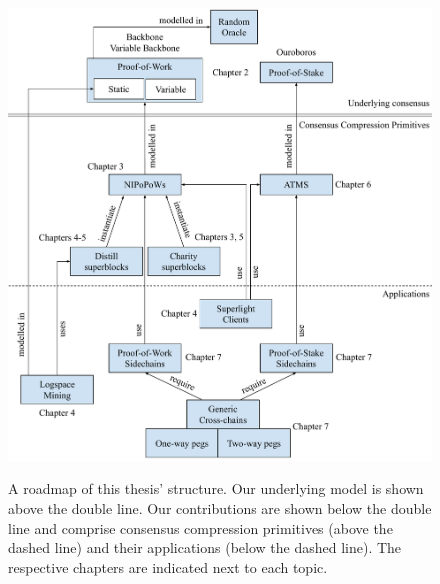 \begin{figure}
    \caption{
      A roadmap of this thesis' structure.
      Our underlying model is shown above the double line.
      Our contributions are shown below the double line and comprise consensus
      compression primitives (above the dashed line) and their applications
      (below the dashed line). The respective chapters are indicated next to
      each topic.
    }
    \centering
    \includegraphics[width=\columnwidth,keepaspectratio]{chapters/introduction/figures/contributions.pdf}
    \label{fig.contributions}
\end{figure}
